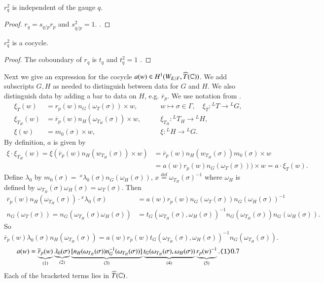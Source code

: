 \documentclass{amsart}
\newenvironment{cthm}[1]
  {\renewcommand\thethm{\bf #1}\thm}
  {\endthm}
\def\taglet#1{\text{\tt (#1)}}
\def\Com{{\Bbb C}}                         %
\def\Def{\overset{\operatorname{def}}=}   %
\def\LANGLANDSO{21}
\begin{document}
\begin{cthm}{Lemma 10.5} $r_q^2$ is independent of the gauge $q$.
\end{cthm}

\begin{proof}  $r_q = s_{q/p}r_p$ and $s_{q/p}^2 = 1$.
\cite{\LANGLANDSO, 2.4}.
\end{proof}

\begin{cthm}{Lemma 10.6}  $r_q^2$ is a cocycle.
\end{cthm}

\begin{proof}  The coboundary of $r_q$ is
$t_q$ and $t_q^2 = 1$ \cite{\LANGLANDSO,2.1.B,2.5.A}.
\end{proof}

Next we give an expression for the cocycle
$a(w) \in H^1(W_{E/F},\widehat T(\Com))$.
We add subscripts $G,H$ as needed to distinguish between
data for $G$  and $H$.  We also distinguish data by adding
a bar to data on $H$, e.g. $\overline r_p$. We use notation from \cite{\LANGLANDSO}.
$$
\begin{array}{lll}
\xi_T(w) &= r_p(w)n_G(\omega_T(\sigma))\times w,
     &\qquad w\mapsto \sigma\in \Gamma,\quad\xi_T:{}^LT\to {}^LG,\\
\xi_{T_H}(w) &=\overline r_p(w)n_H(\omega_{T_H}(\sigma))\times w,
	&\qquad \xi_{T_H}:{}^L{T_H}\to {}^LH,\\
\xi(w) &=m_0(\sigma)\times w, &\qquad \xi:{}^LH\to {}^LG.
\end{array}
$$
By definition, $a$ is given by
$$
\begin{array}{lll}
\xi\cdot\xi_{T_H}(w) =
\xi(\overline r_p(w)n_H(w_{T_H}(\sigma))\times w)
&=\overline r_p(w)n_H(w_{T_H}(\sigma))m_0(\sigma)\times w\\
&=a(w)r_p(w)n_G(\omega_T(\sigma)))\times w = a\cdot\xi_T(w).
\end{array}
$$
Define $\lambda_0$ by\quad
$m_0(\sigma)=\ {}^x\lambda_0(\sigma)n_G(\omega_H(\sigma))$, $x\Def \omega_{T_H}(\sigma)^{-1}$
where $\omega_H$ is defined by
$\omega_{T_H}(\sigma)\omega_H(\sigma)=
\omega_T(\sigma)$.
Then
$$
\begin{array}{lll}
\overline r_p(w)n_H(\omega_{T_H}(\sigma))\cdot{}^x\lambda_0(\sigma)
&=a(w)r_p(w)n_G(\omega_T(\sigma))n_G(\omega_H(\sigma))^{-1}\\
n_G(\omega_T(\sigma)) =n_G(\omega_{T_H}(\sigma)
\omega_H(\sigma)) &=
t_G(\omega_{T_H}(\sigma),\omega_H(\sigma))^{-1}
n_G(\omega_{T_H}(\sigma))n_G(\omega_H(\sigma)).
\end{array}
$$
So
$$
\overline r_p(w)\lambda_0(\sigma)n_H(\omega_{T_H}(\sigma))
= a(w)r_p(w)t_G(\omega_{T_H}(\sigma),
\omega_H(\sigma))^{-1}n_G(\omega_{T_H}(\sigma)).
$$
$$
a(w) =
\underbrace{\overline r_p(w)}_{\text{(1)}}
\underbrace{\lambda_0(\sigma)}_{\text{(2)}}
\underbrace{[n_H(\omega_{T_H}(\sigma))n_G^{-1}(\omega_{T_H}(\sigma))]}_{
\text{(3)}}
\underbrace{t_G(\omega_{T_H}(\sigma),\omega_H(\sigma))}_{\text{(4)}}
\underbrace{r_p(w)^{-1}}_{\text{(5)}}.
\taglet10.7
$$
Each of the bracketed terms lies in $\widehat T(\Com)$.
\end{document}
